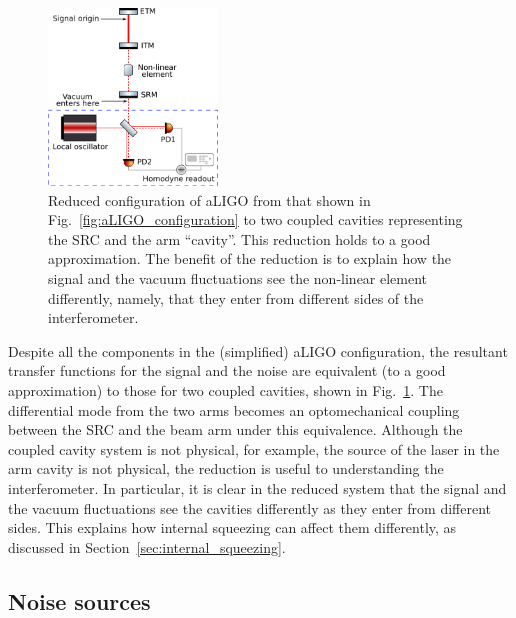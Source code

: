 \documentclass[aps,pra,superscriptaddress,reprint,nofootinbib]{revtex4-1}
\begin{document}
\begin{figure}[ht]
	\begin{center}
	\includegraphics[width=0.4\textwidth]{figures/aLIGO_as_coupled_cavities.pdf}
	\end{center}
	\caption{Reduced configuration of aLIGO from that shown in Fig.~\ref{fig:aLIGO_configuration} to two coupled cavities representing the SRC and the arm “cavity”. This reduction holds to a good approximation. The benefit of the reduction is to explain how the signal and the vacuum fluctuations see the non-linear element differently, namely, that they enter from different sides of the interferometer.}
	\label{fig:aLIGO_as_coupled_cavities}
\end{figure}

Despite all the components in the (simplified) aLIGO configuration, the resultant transfer functions for the signal and the noise are equivalent (to a good approximation) to those for two coupled cavities, shown in Fig.~\ref{fig:aLIGO_as_coupled_cavities}. The differential mode from the two arms becomes an optomechanical coupling between the SRC and the beam arm under this equivalence.
Although the coupled cavity system is not physical, for example, the source of the laser in the arm cavity is not physical, the reduction is useful to understanding the interferometer. In particular, it is clear in the reduced system that the signal and the vacuum fluctuations see the cavities differently as they enter from different sides. This explains how internal squeezing can affect them differently, as discussed in Section~\ref{sec:internal_squeezing}.


\subsection{Noise sources}
\label{sec:noise_sources}
\end{document}
